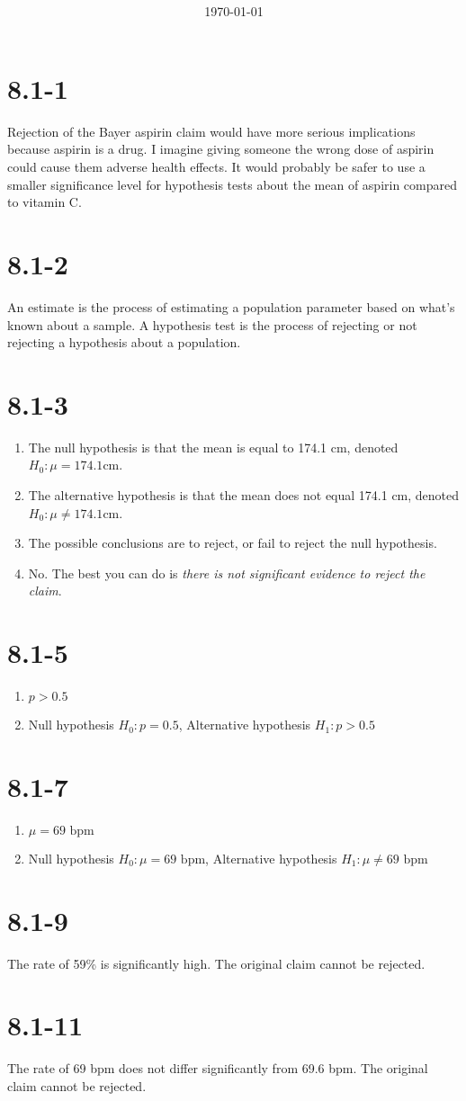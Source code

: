 \documentclass[12pt,fleqn]{article}
\title{\classdescription\ \\ \classname\ \\ $\ $ \\ \assignment}
\author{\authorname}
\date{\today}
\newcommand{\chapter}{8.1}
\newcommand{\problem}[1]{\vspace{5ex}\section*{\chapter-#1}}
\begin{document}
\maketitle


\problem{1}
Rejection of the Bayer aspirin claim would have more serious implications because aspirin is a drug. I imagine giving someone the wrong dose of aspirin could cause them adverse health effects. It would probably be safer to use a smaller significance level for hypothesis tests about the mean of aspirin compared to vitamin C.


\problem{2}
An estimate is the process of estimating a population parameter based on what's known about a sample. A hypothesis test is the process of rejecting or not rejecting a hypothesis about a population.


\problem{3}
\begin{enumerate}[label=\alph*.]
\item The null hypothesis is that the mean is equal to 174.1 cm, denoted $H_0:\mu = 174.1\text{cm}$.
\item The alternative hypothesis is that the mean does not equal 174.1 cm, denoted $H_0:\mu \ne 174.1\text{cm}$.
\item The possible conclusions are to reject, or fail to reject the null hypothesis.
\item No. The best you can do is \textit{there is not significant evidence to reject the claim}.
\end{enumerate}


\problem{5}
\begin{enumerate}[label=\alph*.]
\item $p > 0.5$
\item Null hypothesis $H_0: p = 0.5$, Alternative hypothesis $H_1: p > 0.5$
\end{enumerate}


\problem{7}
\begin{enumerate}[label=\alph*.]
\item $\mu = 69 \text{~bpm}$
\item Null hypothesis $H_0: \mu = 69 \text{~bpm}$, Alternative hypothesis $H_1: \mu \ne 69 \text{~bpm}$
\end{enumerate}


\problem{9}
The rate of 59\% is significantly high. The original claim cannot be rejected.

\problem{11}
The rate of 69 bpm does not differ significantly from 69.6 bpm. The original claim cannot be rejected.
\end{document}
